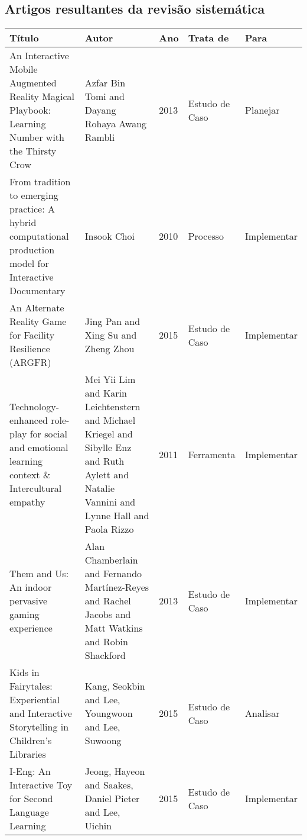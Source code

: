 \documentclass[
article,			%
11pt,				%
oneside,			%
a4paper,			%
english,			%
brazil,				%
sumario=tradicional
]{abntex2}
\begin{document}
  
  \begin{anexosenv}

    \chapter{Artigos resultantes da revisão sistemática}
    \tiny
    \centering
    \label{sec-anexos}
    \begin{longtable}{p{6.0cm}|p{3.0cm}|p{.6cm}|p{2.0cm}|p{2.0cm}}
      \textbf{Título} & \textbf{Autor} & \textbf{Ano} & \textbf{Trata de} & \textbf{Para} \\
      \hline
      An Interactive Mobile Augmented Reality Magical Playbook: Learning Number with the Thirsty Crow&Azfar Bin Tomi and Dayang Rohaya Awang Rambli&2013&Estudo de Caso & Planejar \\
      \hline
      From tradition to emerging practice: A hybrid computational production model for Interactive Documentary &Insook Choi&2010&Processo & Implementar \\
      \hline
      An Alternate Reality Game for Facility Resilience (ARGFR) &Jing Pan and Xing Su and Zheng Zhou&2015&Estudo de Caso & Implementar \\
      \hline
      Technology-enhanced role-play for social and emotional learning context \& Intercultural empathy &Mei Yii Lim and Karin Leichtenstern and Michael Kriegel and Sibylle Enz and Ruth Aylett and Natalie Vannini and Lynne Hall and Paola Rizzo&2011&Ferramenta & Implementar\\
      \hline
      Them and Us: An indoor pervasive gaming experience &Alan Chamberlain and Fernando Martínez-Reyes and Rachel Jacobs and Matt Watkins and Robin Shackford&2013&Estudo de Caso & Implementar\\
      \hline
      Kids in Fairytales: Experiential and Interactive Storytelling in Children's Libraries&Kang, Seokbin and Lee, Youngwoon and Lee, Suwoong&2015&Estudo de Caso & Analisar\\
      \hline
      I-Eng: An Interactive Toy for Second Language Learning&Jeong, Hayeon and Saakes, Daniel Pieter and Lee, Uichin&2015&Estudo de Caso & Implementar\\

\end{longtable}
\end{anexosenv}
\end{document}
